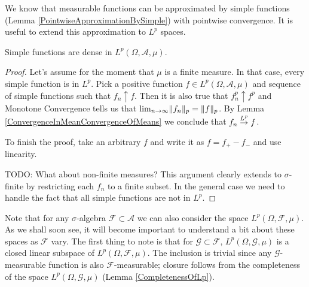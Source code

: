 We know that measurable functions can be approximated by simple
functions (Lemma \ref{PointwiseApproximationBySimple}) with pointwise
convergence.  It is useful to extend this approximation to $L^p$ spaces.
\begin{lem}\label{LpApproximationBySimple}Simple functions are dense in $L^p(\Omega, \mathcal{A}, \mu)$.
\end{lem}
\begin{proof}
Let's assume for the moment that $\mu$ is a finite measure.  In that
case, every simple function is in $L^p$.  Pick a positive function $f
\in L^p(\Omega, \mathcal{A}, \mu)$ and sequence of simple functions
such that $f_n \uparrow f$.  Then it is also true that $f_n^p \uparrow
f^p$ and Monotone Convergence tells us that $\lim_{n \to \infty}
\lVert f_n \rVert_p  = \lVert f \rVert_p$.  By Lemma \ref{ConvergenceInMeanConvergenceOfMeans} we conclude that $f_n
\overset{L^p}\to f$.

To finish the proof, take an arbitrary $f$ and write it as $f = f_+ -
f_-$ and use linearity.

TODO: What about non-finite measures?  This argument clearly extends
to $\sigma$-finite by restricting each $f_n$ to a finite subset.  In
the general case we need to handle the fact that all simple functions
are not in $L^p$.
\end{proof}

Note that for any $\sigma$-algebra $\mathcal{F} \subset \mathcal{A}$
we can also consider the space $ L^p(\Omega,  \mathcal{F}, \mu)$.  
As we shall soon see, it will become important to understand a bit
about these spaces as $\mathcal{F}$ vary.  The first thing to note is
that for $\mathcal{G} \subset \mathcal{F}$, $L^p(\Omega,  \mathcal{G},
\mu)$ is a closed linear subspace of $L^p(\Omega,  \mathcal{F},
\mu)$.  The inclusion is trivial since any $\mathcal{G}$-measurable
function is also $\mathcal{F}$-measurable; closure follows from the
completeness of the space $L^p(\Omega, \mathcal{G}, \mu)$ (Lemma
\ref{CompletenessOfLp}).

